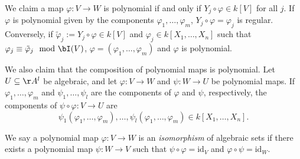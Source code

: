 \documentclass[12pt]{amsart}
\theoremstyle{plain}
\begin{document}
We claim a map $\varphi: V \to W$ is polynomial if and only if $Y_j \circ \varphi \in k[V]$ for all $j$.
If $\varphi$ is polynomial given by the components $\varphi_1, \ldots, \varphi_m$, $Y_j \circ \varphi = \varphi_j$ is regular.
Conversely, if $\tilde \varphi_j := Y_j \circ \varphi \in k[V]$ and $\varphi_j \in k[X_1, \ldots, X_n]$ such that $\varphi_j \equiv \tilde \varphi_j \mod \bI(V)$, $\varphi = (\varphi_1, \ldots, \varphi_m)$ and $\varphi$ is polynomial.

We also claim that the composition of polynomial maps is polynomial.
Let $U \subseteq \AA^l$ be algebraic, and let $\varphi: V \to W$ and $\psi : W \to U$ be polynomial maps.
If $\varphi_1, \ldots, \varphi_m$ and $\psi_1, \ldots, \psi_l$ are the components of $\varphi$ and $\psi$, respectively, the components of $\psi \circ \varphi : V \to U$ are
$$\psi_1(\varphi_1, \ldots, \varphi_m), \ldots, \psi_l(\varphi_1, \ldots, \varphi_m) \in k[X_1, \ldots, X_n].$$

We say a polynomial map $\varphi : V \to W$ is an \emph{isomorphism} of algebraic sets if there exists a polynomial map $\psi: W \to V$ such that $\psi \circ \varphi = \mathrm{id}_V$ and $\varphi \circ \psi = \mathrm{id}_W$.
\end{document}
